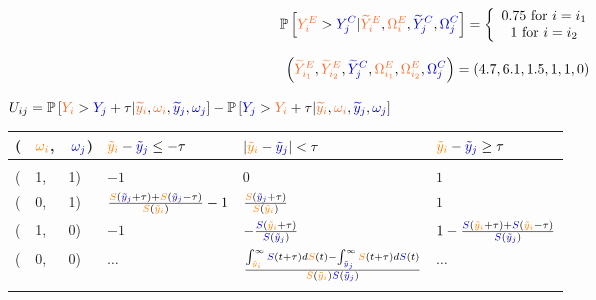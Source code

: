 \documentclass[12pt]{article}
\theoremstyle{definition}
\newcommand{\darkblue}{blue!80!black}
\newcommand{\Ysurv}{\textcolor{\darkblue}{S}}
\newcommand{\yobs}{\textcolor{\darkblue}{\tilde{y}_j}}
\newcommand{\Ycens}{\textcolor{\darkblue}{\omega_j}}
\newcommand{\Xsurv}{\textcolor{orange}{S}}
\newcommand{\xobs}{\textcolor{orange}{\tilde{y}_i}}
\newcommand{\Xcens}{\textcolor{orange}{\omega_i}}
\begin{document}
\begin{align*}	\mathbb{P}\left[\textcolor{Orange}{Y^E_{i}}>\textcolor{\darkblue}{Y^C_{j}}|\textcolor{Orange}{\widetilde{Y}^E_{i}},\textcolor{Orange}{\Omega^E_i},\textcolor{\darkblue}{\widetilde{Y}^C_{j}},\textcolor{\darkblue}{\Omega^C_j}\right] = \left\{\begin{array}{c}
		0.75 \text{ for } i=i_1 \\
		1 \text{ for } i=i_2
	\end{array}\right.
\end{align*}

\begin{align*}
\left(
\textcolor{Orange}{\widetilde{Y}^E_{i_1}},
\textcolor{Orange}{\widetilde{Y}^E_{i_2}},
\textcolor{\darkblue}{\widetilde{Y}^C_{j}},
\textcolor{Orange}{\Omega^E_{i_1}},
\textcolor{Orange}{\Omega^E_{i_2}},
\textcolor{\darkblue}{\Omega^C_{j}}
\right) = (4.7,6.1,1.5,1,1,0)
\end{align*}

\(U_{ij}=\mathbb{P}\left[\textcolor{Orange}{Y_{i}}>\textcolor{\darkblue}{Y_{j}}+\tau|\textcolor{Orange}{\widetilde{y}_{i}},\textcolor{Orange}{\omega_i},\textcolor{\darkblue}{\widetilde{y}_{j}},\textcolor{\darkblue}{\omega_j}\right]-\mathbb{P}\left[\textcolor{\darkblue}{Y_{j}}>\textcolor{Orange}{Y_{i}}+\tau|\textcolor{Orange}{\widetilde{y}_{i}},\textcolor{Orange}{\omega_i},\textcolor{\darkblue}{\widetilde{y}_{j}},\textcolor{\darkblue}{\omega_j}\right]\)
\begin{table}[!ht]
	\centering
	\begin{tabular}{l@{}l@{}l|lll}
		(&$\Xcens$, & $\, \Ycens$) & $\xobs - \yobs \leq -\tau$ & $ |\xobs-\yobs| < \tau$ & $\xobs - \yobs \geq \tau$ \\ \hline 
		&&&&&\\ [-3mm]
		(&1,&1) & \(-1\) & \(0\) & \(1\) \\ [4mm]
		(&0,&1) & \(\frac{\Xsurv(\yobs+\tau)+\Xsurv(\yobs-\tau)}{\Xsurv(\xobs)}-1\) & $\frac{\Xsurv(\yobs + \tau)}{\Xsurv(\xobs)}$ & \(1\) \\ [4mm]
		(&1,&0) & \(-1\) &  $-\frac{\Ysurv(\xobs + \tau)}{\Ysurv(\yobs)}$ & \(1-\frac{\Ysurv(\xobs+\tau)+\Ysurv(\xobs-\tau)}{\Ysurv(\yobs)}\) \\ [4mm]
		(&0,&0) & \(\ldots\)
		& \(\frac{\int_{\xobs}^{\infty} \Ysurv(t+\tau)d\Xsurv(t)-\int_{\yobs}^{\infty} \Xsurv(t+\tau)d\Ysurv(t)}{\Xsurv(\xobs)\Ysurv(\yobs)}\)
		& \(\ldots\)
		\\ [-4mm]
		&&&&&\\ \hline
	\end{tabular}
\end{table}
\end{document}
